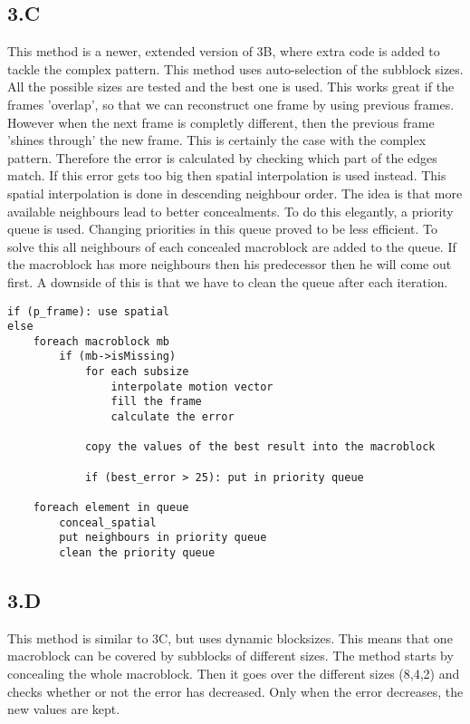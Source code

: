 \subsection{3.C}
This method is a newer, extended version of 3B, where extra code is added to tackle the complex pattern.
This method uses auto-selection of the subblock sizes. All the possible sizes are tested and the best one is used.
This works great if the frames 'overlap', so that we can reconstruct one frame by using previous frames. However when the next frame is completly different, then the previous frame 'shines through' the new frame. This is certainly the case with the complex pattern. Therefore the error is calculated by checking which part of the edges match. If this error gets too big then spatial interpolation is used instead.
\npar
This spatial interpolation is done in descending neighbour order. The idea is that more available neighbours lead to better concealments. To do this elegantly, a priority queue is used. Changing priorities in this queue proved to be less efficient. To solve this all neighbours of each concealed macroblock are added to the queue. If the macroblock has more neighbours then his predecessor then he will come out first. A downside of this is that we have to clean the queue after each iteration.
\vspace{1em}
\begin{lstlisting}[frame=single]
if (p_frame): use spatial
else
	foreach macroblock mb
    	if (mb->isMissing)
        	for each subsize
        		interpolate motion vector
            	fill the frame
            	calculate the error
                
			copy the values of the best result into the macroblock
                
            if (best_error > 25): put in priority queue
            
	foreach element in queue
    	conceal_spatial
        put neighbours in priority queue
        clean the priority queue
\end{lstlisting}

\subsection{3.D}
This method is similar to 3C, but uses dynamic blocksizes. This means that one macroblock can be covered by subblocks of different sizes. The method starts by concealing the whole macroblock. Then it goes over the different sizes (8,4,2) and checks whether or not the error has decreased. Only when the error decreases, the new values are kept.


